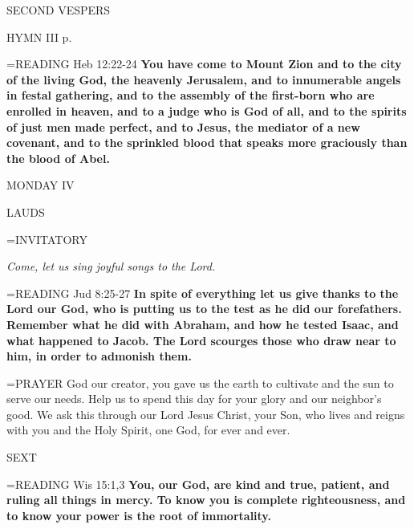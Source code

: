 \begin{flushleft}\normalsize SECOND VESPERS\\\end{flushleft}

HYMN III p. \pageref{ordinaryTime:thirdHymn}

\hangindent=\parindent \small{READING} Heb 12:22-24 \textbf{You have come to Mount Zion and to the city of the living God, the heavenly Jerusalem, and to innumerable angels in festal gathering, and to the assembly of the first-born who are enrolled in heaven, and to a judge who is God of all, and to the spirits of just men made perfect, and to Jesus, the mediator of a new covenant, and to the sprinkled blood that speaks more graciously than the blood of Abel.\\}

\begin{center}
\normalsize MONDAY IV
\end{center}

\begin{flushleft}\normalsize LAUDS\\\end{flushleft}

\hangindent=\parindent \small{INVITATORY}
\begin{center}
\textit{Come, let us sing joyful songs to the Lord.\\}
\end{center}

\hangindent=\parindent \small{READING} Jud 8:25-27 \textbf{In spite of everything let us give thanks to the Lord our God, who is putting us to the test as he did our forefathers.  Remember what he did with Abraham, and how he tested Isaac, and what happened to Jacob. The Lord scourges those who draw near to him, in order to admonish them.\\}

\hangindent=\parindent \small{PRAYER  God our creator, you gave us the earth to cultivate and the sun to serve our needs. Help us to spend this day for your glory and our neighbor’s good. We ask this through our Lord Jesus Christ, your Son, who lives and reigns with you and the Holy Spirit, one God, for ever and ever.}

\begin{flushleft}\normalsize SEXT\\\end{flushleft}

\hangindent=\parindent \small{READING} Wis 15:1,3 \textbf{You, our God, are kind and true, patient, and ruling all things in mercy. To know you is complete righteousness, and to know your power is the root of immortality.}


